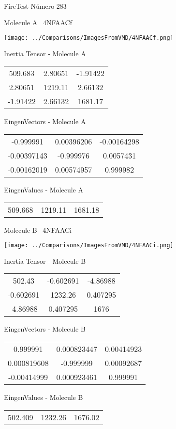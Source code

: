 \vtab[-3cm]
\begin{center}
{\large FireTest \tab Número 283}
\end{center}
\begin{multicols}{2}
\begin{center}

Molecule A \
4NFAACf

\texttt{[image: ../Comparisons/ImagesFromVMD/4NFAACf.png]}

Inertia Tensor - Molecule A \\
\begin{tabular}{|c c c|}
509.683	 & 	2.80651	 & 	-1.91422	 \\
2.80651	 & 	1219.11	 & 	2.66132	 \\
-1.91422	 & 	2.66132	 & 	1681.17
\end{tabular}

\vtab
 EingenVectors - Molecule A     \\
\begin{tabular}{|c c c|}
-0.999991	 & 	0.00396206	 & 	-0.00164298	 \\
-0.00397143	 & 	-0.999976	 & 	0.0057431	 \\
-0.00162019	 & 	0.00574957	 & 	0.999982
\end{tabular}

\vtab
 EingenValues - Molecule A     \\
\begin{tabular}{|c c c|}
509.668	 & 	1219.11	 & 	1681.18	 \\
\end{tabular}
\columnbreak

Molecule B \
4NFAACi

\texttt{[image: ../Comparisons/ImagesFromVMD/4NFAACi.png]}

Inertia Tensor - Molecule B \\
\begin{tabular}{|c c c|}
502.43	 & 	-0.602691	 & 	-4.86988	 \\
-0.602691	 & 	1232.26	 & 	0.407295	 \\
-4.86988	 & 	0.407295	 & 	1676
\end{tabular}

\vtab
 EingenVectors - Molecule B     \\
\begin{tabular}{|c c c|}
0.999991	 & 	0.000823447	 & 	0.00414923	 \\
0.000819608	 & 	-0.999999	 & 	0.00092687	 \\
-0.00414999	 & 	0.000923461	 & 	0.999991
\end{tabular}

\vtab
 EingenValues - Molecule B     \\
\begin{tabular}{|c c c|}
502.409	 & 	1232.26	 & 	1676.02	 \\
\end{tabular}

\end{center}
\end{multicols}

